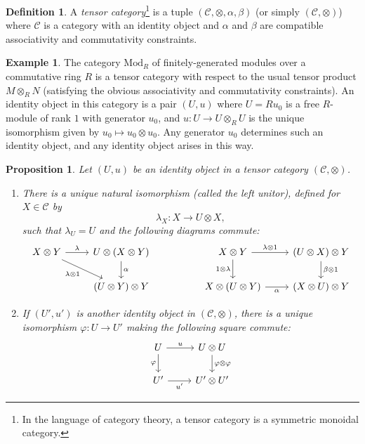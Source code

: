 \documentclass[10pt]{amsart}
\numberwithin{equation}{section}
\def\~#1{\mathscr{#1}}
\newcommand{\vp}{\varphi}
\newcommand{\Mod}{\mathrm{Mod}}
\theoremstyle{plain}
\newtheorem{prop}[thm]{Proposition}
\theoremstyle{definition}
\newtheorem{defn}[thm]{Definition}
\newtheorem{ex}[thm]{Example}
\theoremstyle{remark}
\begin{document}
\begin{defn}
    A \emph{tensor category}\footnote{In the language of category theory, a tensor category is a symmetric monoidal category.} is a tuple $(\~C, \otimes, \alpha, \beta)$ (or simply $(\~C, \otimes)$) where $\~C$ is a category with an identity object and $\alpha$ and $\beta$ are compatible associativity and commutativity constraints.
\end{defn}

\begin{ex}
    The category $\Mod_R$ of finitely-generated modules over a commutative ring $R$ is a tensor category with respect to the usual tensor product $M \otimes_R N$ (satisfying the obvious associativity and commutativity constraints). An identity object in this category is a pair $(U, u)$ where $U = Ru_0$ is a free $R$-module of rank $1$ with generator $u_0$, and $u: U \to U \otimes_R U$ is the unique isomorphism given by $u_0 \mapsto u_0 \otimes u_0$. Any generator $u_0$ determines such an identity object, and any identity object arises in this way. 
\end{ex}

\begin{prop}\label{prop:LeftUnitor}
    Let $(U, u)$ be an identity object in a tensor category $(\~C, \otimes)$.
    \begin{enumerate}
        \item There is a unique natural isomorphism (called the \emph{left unitor}), defined for $X \in \~C$ by
        \[\lambda_X: X \to U \otimes X,\]
        such that $\lambda_U = U$ and the following diagrams commute:
        \[\begin{tikzcd}[]
            {X \otimes Y} & {U \otimes (X \otimes Y)} && {X \otimes Y} & {(U \otimes X) \otimes Y} \\
            & {(U \otimes Y)\otimes Y} && {X \otimes (U \otimes Y)} & {(X \otimes U) \otimes Y}
            \arrow["\lambda", from=1-1, to=1-2]
            \arrow["{\lambda \otimes 1}"', from=1-1, to=2-2]
            \arrow["\alpha", from=1-2, to=2-2]
            \arrow["{\lambda \otimes 1}", from=1-4, to=1-5]
            \arrow["{1 \otimes \lambda}"', from=1-4, to=2-4]
            \arrow["{\beta \otimes 1}", from=1-5, to=2-5]
            \arrow["\alpha"', from=2-4, to=2-5]
        \end{tikzcd}\]
        \item If $(U', u')$ is another identity object in $(\~C, \otimes)$, there is a unique isomorphism $\vp: U \to U'$ making the following square commute:
        \[\begin{tikzcd}
            U & {U \otimes U} \\
            {U'} & {U' \otimes U'}
            \arrow["u", from=1-1, to=1-2]
            \arrow["\vp"', from=1-1, to=2-1]
            \arrow["{\vp \otimes \vp}", from=1-2, to=2-2]
            \arrow["{u'}"', from=2-1, to=2-2]
        \end{tikzcd}\]
    \end{enumerate}
\end{prop}
\end{document}

